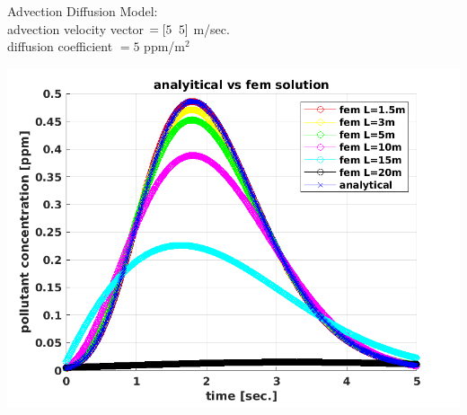\documentclass{beamer}
\begin{document}
\begin{frame}
Advection Diffusion Model:\\
advection velocity vector $=[5 \hspace{2mm} 5]$ m/sec.\\
diffusion coefficient $=5$ ppm/m$^2$
\end{frame}
\begin{frame}
\end{frame}
\begin{frame}
\center
\includegraphics[scale=0.6]{pics/comparison.png}
\end{frame}
\end{document}
